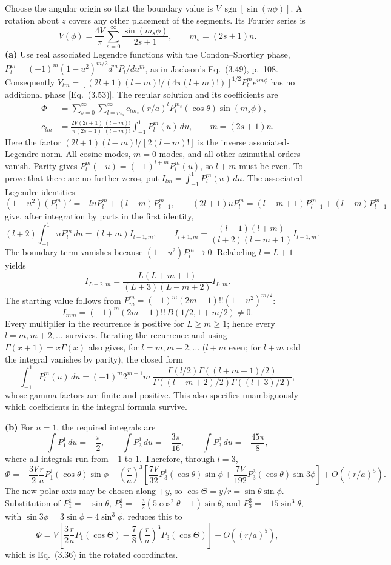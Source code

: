 Choose the angular origin so that the boundary value is
$V\,\operatorname{sgn}[\sin(n\phi)]$.  A rotation about $z$ covers any
other placement of the segments.  Its Fourier series is
\[
V(\phi)=\frac{4V}{\pi}\sum_{s=0}^\infty
\frac{\sin(m_s\phi)}{2s+1},\qquad m_s=(2s+1)n.
\]
\textbf{(a)} Use real associated Legendre functions with the
Condon--Shortley phase, $P_l^m=(-1)^m(1-u^2)^{m/2}d^mP_l/du^m$,
as in Jackson's Eq.~(3.49), p.~108.  Consequently
$Y_{lm}=[(2l+1)(l-m)!/(4\pi(l+m)!)]^{1/2}P_l^m e^{im\phi}$
has no additional phase [Eq.~(3.53)].
The regular solution and its coefficients are
\begin{align*}
\Phi&=\sum_{s=0}^\infty\sum_{l=m_s}^\infty
c_{lm_s}(r/a)^lP_l^{m_s}(\cos\theta)\sin(m_s\phi),\\
c_{lm}&=\frac{2V(2l+1)}{\pi(2s+1)}
\frac{(l-m)!}{(l+m)!}\int_{-1}^1P_l^m(u)\,du,
\qquad m=(2s+1)n.
\end{align*}
Here the factor $(2l+1)(l-m)!/[2(l+m)!]$ is the inverse
associated-Legendre norm.  All cosine modes, $m=0$ modes, and all
other azimuthal orders vanish.  Parity gives
$P_l^m(-u)=(-1)^{l+m}P_l^m(u)$, so $l+m$ must be even.
To prove that there are no further zeros, put
$I_{lm}=\int_{-1}^1P_l^m(u)\,du$.  The associated-Legendre identities
\[
(1-u^2)(P_l^m)'=-luP_l^m+(l+m)P_{l-1}^m,\qquad
(2l+1)uP_l^m=(l-m+1)P_{l+1}^m+(l+m)P_{l-1}^m
\]
give, after integration by parts in the first identity,
\[
(l+2)\int_{-1}^1uP_l^m\,du=(l+m)I_{l-1,m},\qquad
I_{l+1,m}=\frac{(l-1)(l+m)}{(l+2)(l-m+1)}I_{l-1,m}.
\]
The boundary term vanishes because $(1-u^2)P_l^m\to0$.  Relabeling
$l=L+1$ yields
\[
I_{L+2,m}=\frac{L(L+m+1)}{(L+3)(L-m+2)}I_{L,m}.
\]
The starting value follows from
$P_m^m=(-1)^m(2m-1)!!(1-u^2)^{m/2}$:
\[
I_{mm}=(-1)^m(2m-1)!!\,B(1/2,1+m/2)\ne0.
\]
Every multiplier in the recurrence is positive for $L\geq m\geq1$;
hence every $l=m,m+2,\ldots$ survives.  Iterating the recurrence
and using $\Gamma(x+1)=x\Gamma(x)$ also gives, for $l=m,m+2,\ldots$ ($l+m$ even; for $l+m$ odd the integral vanishes by parity), the closed form
\[
\int_{-1}^1P_l^m(u)\,du
=(-1)^m2^{m-1}m\,
\frac{\Gamma(l/2)\Gamma((l+m+1)/2)}
{\Gamma((l-m+2)/2)\Gamma((l+3)/2)},
\]
whose gamma factors are finite and positive.  This also specifies
unambiguously which coefficients in the integral formula survive.

\textbf{(b)} For $n=1$, the required integrals are
\[
\int P_1^1\,du=-\frac\pi2,\qquad
\int P_3^1\,du=-\frac{3\pi}{16},\qquad
\int P_3^3\,du=-\frac{45\pi}{8},
\]
where all integrals run from $-1$ to $1$.  Therefore, through $l=3$,
\[
\Phi=-\frac{3V}{2}\frac ra P_1^1(\cos\theta)\sin\phi
-\left(\frac ra\right)^3
\left[\frac{7V}{32}P_3^1(\cos\theta)\sin\phi
+\frac{7V}{192}P_3^3(\cos\theta)\sin3\phi\right]+O((r/a)^5).
\]
The new polar axis may be chosen along $+y$, so
$\cos\Theta=y/r=\sin\theta\sin\phi$.  Substitution of
$P_1^1=-\sin\theta$,
$P_3^1=-\tfrac32(5\cos^2\theta-1)\sin\theta$, and
$P_3^3=-15\sin^3\theta$, with
$\sin3\phi=3\sin\phi-4\sin^3\phi$, reduces this to
\[
\Phi=V\left[\frac32\frac ra P_1(\cos\Theta)
-\frac78\left(\frac ra\right)^3P_3(\cos\Theta)\right]
+O((r/a)^5),
\]
which is Eq.~(3.36) in the rotated coordinates.

